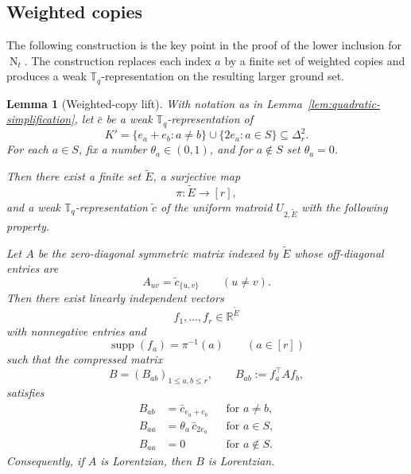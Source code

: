 \documentclass[12pt]{amsart}
\newtheorem{lemma}[theorem]{Lemma}
\theoremstyle{definition}
\newcommand{\1}{\mathbf{1}}
\DeclareMathOperator{\upN}{N}   %
\DeclareMathOperator{\supp}{supp}
\newcommand\T{{\mathbb T}}
\newcommand\ol{\texorpdfstring{\textbf{Oliver:} }{Oliver: }}
\begin{document}
\subsection{Weighted copies}

The following construction is the key point in the proof of the lower
inclusion for $\upN_t$.
The construction replaces each index $a$ by a finite set of weighted copies and
produces a weak $\T_q$-representation on the resulting larger ground set.  



\begin{lemma}[Weighted-copy lift]
\label{lem:weighted-copy-lift}
With notation as in Lemma~\ref{lem:quadratic-simplification}, let
$\bar c$ be a weak $\T_q$-representation of
\[
K'=\{e_a+e_b:a\ne b\}\cup\{2e_a:a\in S\}\subseteq \Delta_r^2.
\]
For each $a\in S$, fix a number $\theta_a\in(0,1)$, and for
$a\notin S$ set $\theta_a=0$.

Then there exist a finite set $\widetilde E$, a surjective map
\[
\pi:\widetilde E\to [r],
\]
and a weak $\T_q$-representation $\widetilde c$ of the uniform matroid
$U_{2,\widetilde E}$ with the following property.

Let $A$ be the zero-diagonal symmetric matrix indexed by $\widetilde E$ whose
off-diagonal entries are
\[
A_{uv}=\widetilde c_{\{u,v\}}\qquad(u\ne v).
\]
Then there exist linearly independent vectors
\[
f_1,\ldots,f_r\in \mathbb R^{\widetilde E}
\]
with nonnegative entries and
\[
\supp(f_a)=\pi^{-1}(a)\qquad(a\in[r])
\]
such that the compressed matrix
\[
B=(B_{ab})_{1\le a,b\le r},
\qquad
B_{ab}:=f_a^\top A f_b,
\]
satisfies
\begin{equation}
\label{eq:weighted-copy-compression}
\begin{aligned}
B_{ab}&=\bar c_{e_a+e_b} &&\text{for } a\ne b,\\
B_{aa}&=\theta_a\,\bar c_{2e_a} &&\text{for } a\in S,\\
B_{aa}&=0 &&\text{for } a\notin S.
\end{aligned}
\end{equation}
Consequently, if $A$ is Lorentzian, then $B$ is Lorentzian.
\end{lemma}
\end{document}
